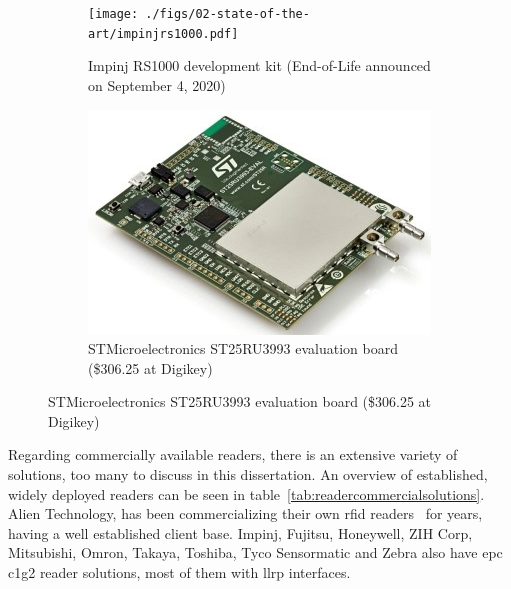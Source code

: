 \begin{figure}[H]
    \centering
    \begin{subfigure}{.35\textwidth}
        \centering
        \texttt{[image: ./figs/02-state-of-the-art/impinjrs1000.pdf]}
        \caption{Impinj RS1000 development kit (End-of-Life announced on September 4, 2020)} 
        \label{fig:impinjrs1000}
    \end{subfigure}
    \begin{subfigure}{.55\textwidth}
        \centering
        \includegraphics[width=\linewidth]{./figs/02-state-of-the-art/st25ru3993-eval.jpg}
        \caption{STMicroelectronics ST25RU3993 evaluation board (\$306.25 at Digikey)} 
        \label{fig:st25ru3993}
    \end{subfigure}
    \label{fig:devboards}
\end{figure}

Regarding commercially available readers, there is an extensive variety of solutions, too many to discuss in this dissertation. An overview of established, widely deployed readers can be seen in table~\ref{tab:readercommercialsolutions}.
Alien Technology, has been commercializing their own \ac{rfid} readers~\cite{AlienTechnologyReaders} for years, having a well established client base. Impinj, Fujitsu, Honeywell, ZIH Corp, Mitsubishi, Omron, Takaya, Toshiba, Tyco Sensormatic and Zebra also have \ac{epc} \ac{c1g2} reader solutions, most of them with \ac{llrp} interfaces.

